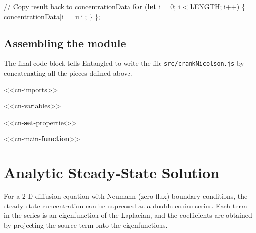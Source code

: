 \documentclass[
  letterpaper,
  DIV=11,
  numbers=noendperiod]{scrreprt}
\newenvironment{Shaded}{\begin{snugshade}}{\end{snugshade}}
\newcommand{\CommentTok}[1]{\textcolor[rgb]{0.37,0.37,0.37}{#1}}
\newcommand{\ControlFlowTok}[1]{\textcolor[rgb]{0.00,0.23,0.31}{\textbf{#1}}}
\newcommand{\DecValTok}[1]{\textcolor[rgb]{0.68,0.00,0.00}{#1}}
\newcommand{\KeywordTok}[1]{\textcolor[rgb]{0.00,0.23,0.31}{\textbf{#1}}}
\newcommand{\NormalTok}[1]{\textcolor[rgb]{0.00,0.23,0.31}{#1}}
\newcommand{\OperatorTok}[1]{\textcolor[rgb]{0.37,0.37,0.37}{#1}}
\begin{document}
\begin{Shaded}
\begin{Highlighting}[]
    \CommentTok{// Copy result back to concentrationData}
    \ControlFlowTok{for}\NormalTok{ (}\KeywordTok{let}\NormalTok{ i }\OperatorTok{=} \DecValTok{0}\OperatorTok{;}\NormalTok{ i }\OperatorTok{\textless{}}\NormalTok{ LENGTH}\OperatorTok{;}\NormalTok{ i}\OperatorTok{++}\NormalTok{) \{}
\NormalTok{        concentrationData[i] }\OperatorTok{=}\NormalTok{ u[i]}\OperatorTok{;}
\NormalTok{    \}}
\NormalTok{\}}\OperatorTok{;}
\end{Highlighting}
\end{Shaded}

\section{Assembling the module}\label{assembling-the-module-1}

The final code block tells Entangled to write the file
\texttt{src/crankNicolson.js} by concatenating all the pieces defined
above.

\begin{Shaded}
\begin{Highlighting}[]
\OperatorTok{\textless{}\textless{}}\NormalTok{cn}\OperatorTok{{-}}\NormalTok{imports}\OperatorTok{\textgreater{}\textgreater{}}

\OperatorTok{\textless{}\textless{}}\NormalTok{cn}\OperatorTok{{-}}\NormalTok{variables}\OperatorTok{\textgreater{}\textgreater{}}

\OperatorTok{\textless{}\textless{}}\NormalTok{cn}\OperatorTok{{-}}\KeywordTok{set}\OperatorTok{{-}}\NormalTok{properties}\OperatorTok{\textgreater{}\textgreater{}}

\OperatorTok{\textless{}\textless{}}\NormalTok{cn}\OperatorTok{{-}}\NormalTok{main}\OperatorTok{{-}}\KeywordTok{function}\OperatorTok{\textgreater{}\textgreater{}}
\end{Highlighting}
\end{Shaded}


\chapter{Analytic Steady‑State
Solution}\label{analytic-steadystate-solution}

For a 2‑D diffusion equation with Neumann (zero‑flux) boundary
conditions, the steady‑state concentration can be expressed as a double
cosine series. Each term in the series is an eigenfunction of the
Laplacian, and the coefficients are obtained by projecting the source
term onto the eigenfunctions.
\end{document}
